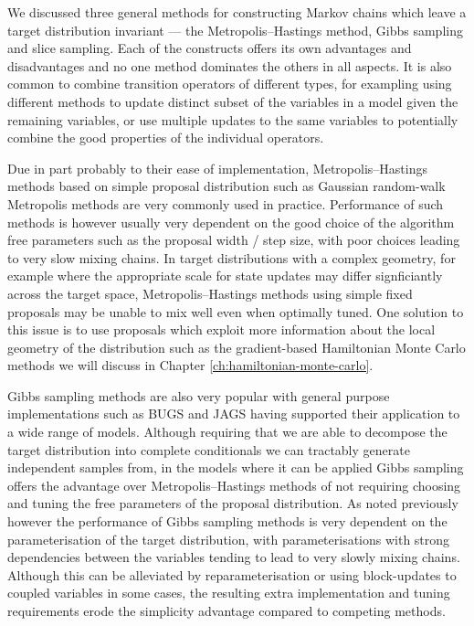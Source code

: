

We discussed three general methods for constructing Markov chains which leave a target distribution invariant --- the Metropolis--Hastings method, Gibbs sampling and slice sampling. Each of the constructs offers its own advantages and disadvantages and no one method dominates the others in all aspects. It is also common to combine transition operators of different types, for exampling using different methods to update distinct subset of the variables in a model given the remaining variables, or use multiple updates to the same variables to potentially combine the good properties of the individual operators.

Due in part probably to their ease of implementation, Metropolis--Hast\-ings methods based on simple proposal distribution such as Gaussian random-walk Metropolis methods are very commonly used in practice. Performance of such methods is however usually very dependent on the good choice of the algorithm free parameters such as the proposal width / step size, with poor choices leading to very slow mixing chains. In target distributions with a complex geometry, for example where the appropriate scale for state updates may differ signficiantly across the target space, Metropolis--Hastings methods using simple fixed proposals may be unable to mix well even when optimally tuned. One solution to this issue is to use proposals which exploit more information about the local geometry of the distribution such as the gradient-based Hamiltonian Monte Carlo methods we will discuss in Chapter \ref{ch:hamiltonian-monte-carlo}.

Gibbs sampling methods are also very popular with general purpose implementations such as BUGS \citep{gilks1994language} and JAGS \citep{plummer2003jags} having supported their application to a wide range of models. Although requiring that we are able to decompose the target distribution into complete conditionals we can tractably generate independent samples from, in the models where it can be applied Gibbs sampling offers the advantage over Metropolis--Hastings methods of not requiring choosing and tuning the free parameters of the proposal distribution. As noted previously however the performance of Gibbs sampling methods is very dependent on the parameterisation of the target distribution, with parameterisations with strong dependencies between the variables tending to lead to very slowly mixing chains. Although this can be alleviated by reparameterisation or using block-updates to coupled variables in some cases, the resulting extra implementation and tuning requirements erode the simplicity advantage compared to competing methods.

